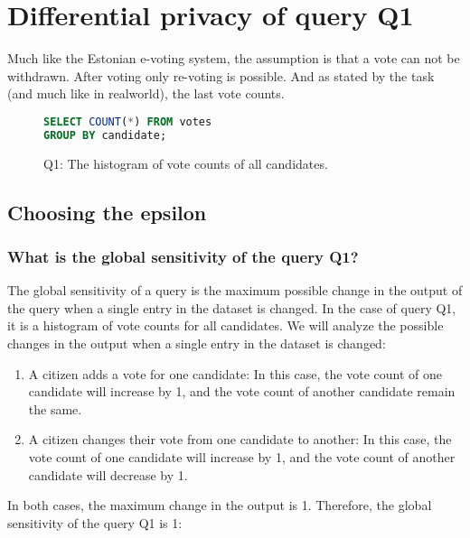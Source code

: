 

\newpage
\section{Differential privacy of query Q1}

Much like the Estonian e-voting system, the assumption is that a vote can not be withdrawn.
After voting only re-voting is possible.
And as stated by the task (and much like in realworld), the last vote counts.

\begin{figure}[ht]
  \begin{lstlisting}[language=sql]
SELECT COUNT(*) FROM votes
GROUP BY candidate;
  \end{lstlisting}
  \caption{Q1: The histogram of vote counts of all candidates.}
  \label{fig:histogramQ1}
\end{figure}
\subsection{Choosing the epsilon}



\subsubsection{What is the global sensitivity of the query Q1?}

The global sensitivity of a query is the maximum possible change in the output of the query when a single entry in the dataset is changed. In the case of query Q1, it is a histogram of vote counts for all candidates. We will analyze the possible changes in the output when a single entry in the dataset is changed:

\begin{enumerate}
  \item A citizen adds a vote for one candidate: In this case, the vote count of one candidate will increase by 1, and
  the vote count of another candidate remain the same.
  \item A citizen changes their vote from one candidate to another: In this case, the vote count of one candidate will increase by 1, and the vote count of another candidate will decrease by 1.
\end{enumerate}

In both cases, the maximum change in the output is 1. Therefore, the global sensitivity of the query Q1 is 1:

